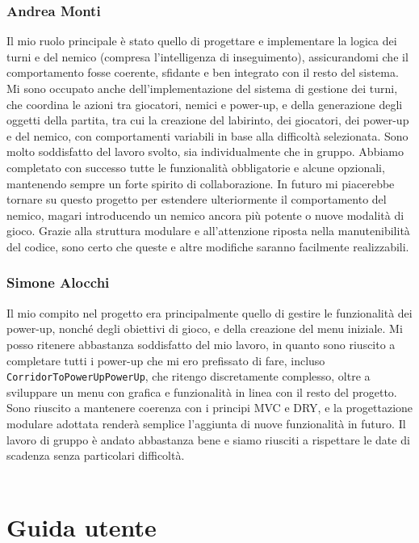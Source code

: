 \documentclass[a4paper,12pt]{report}
\begin{document}
\subsection{Andrea Monti}
Il mio ruolo principale è stato quello di progettare e implementare la logica dei turni e del nemico (compresa 
l’intelligenza di inseguimento), assicurandomi che il comportamento fosse coerente, sfidante e ben integrato con il 
resto del sistema. Mi sono occupato anche dell’implementazione del sistema di gestione dei turni, che coordina le azioni 
tra giocatori, nemici e power-up, e della generazione degli oggetti della partita, tra cui la creazione del labirinto, dei 
giocatori, dei power-up e del nemico, con comportamenti variabili in base alla difficoltà selezionata.
Sono molto soddisfatto del lavoro svolto, sia individualmente che in gruppo. Abbiamo completato con successo tutte le 
funzionalità obbligatorie e alcune opzionali, mantenendo sempre un forte spirito di collaborazione.
In futuro mi piacerebbe tornare su questo progetto per estendere ulteriormente il comportamento del nemico, 
magari introducendo un nemico ancora più potente o nuove modalità di gioco. Grazie alla struttura modulare e all’attenzione 
riposta nella manutenibilità del codice, sono certo che queste e altre modifiche saranno facilmente realizzabili.

\subsection{Simone Alocchi}
Il mio compito nel progetto era principalmente quello di gestire le funzionalità dei power-up, nonché degli obiettivi di gioco, e della creazione del menu iniziale.  
Mi posso ritenere abbastanza soddisfatto del mio lavoro, in quanto sono riuscito a completare tutti i power-up che mi ero prefissato di fare, incluso \texttt{CorridorToPowerUpPowerUp}, 
che ritengo discretamente complesso, oltre a sviluppare un menu con grafica e funzionalità in linea con il resto del progetto.  
Sono riuscito a mantenere coerenza con i principi MVC e DRY, e la progettazione modulare adottata renderà semplice l’aggiunta di nuove funzionalità in futuro.  
Il lavoro di gruppo è andato abbastanza bene e siamo riusciti a rispettare le date di scadenza senza particolari difficoltà.
\\
\\
\appendix

\chapter{Guida utente}
\end{document}
